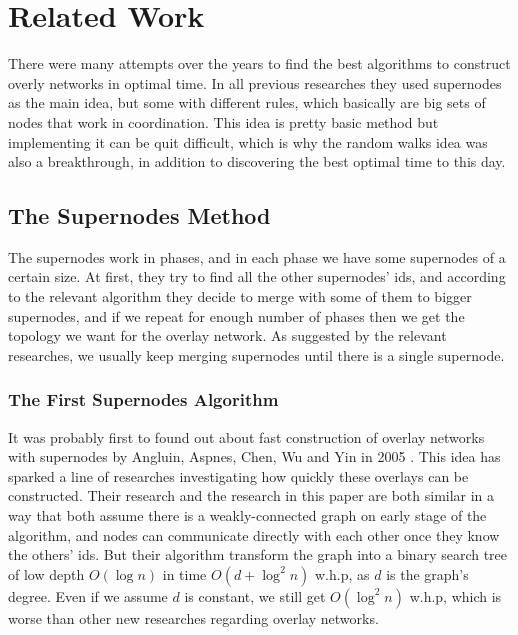 \documentclass[11pt]{article}
\begin{document}
\section{Related Work}
There were many attempts over the years to find the best algorithms to construct overly networks in optimal time. In all previous researches they used supernodes as the main idea, but some with different rules, which basically are big sets of nodes that work in coordination. This idea is pretty basic method but implementing it can be quit difficult, which is why the random walks idea was also a breakthrough, in addition to discovering the best optimal time to this day.

\subsection{The Supernodes Method}
The supernodes work in phases, and in each phase we have some supernodes of a certain size. At first, they try to find all the other supernodes' ids, and according to the relevant algorithm they decide to merge with some of them to bigger supernodes, and if we repeat for enough number of phases then we get the topology we want for the overlay network. As suggested by the relevant researches, we usually keep merging supernodes until there is a single supernode.

\subsubsection{The First Supernodes Algorithm}
It was probably first to found out about fast construction of overlay networks with supernodes by Angluin, Aspnes, Chen, Wu and Yin in 2005 \cite{ref2}. This  idea has sparked a line of researches investigating how quickly these overlays can be constructed. Their research and the research in this paper are both similar in a way that both assume there is a weakly-connected graph on early stage of the algorithm, and nodes can communicate directly with each other once they know the others' ids. But their algorithm transform the graph into a binary search tree of low depth $O(\log{n})$ in time $O(d+\log^2{n})$ w.h.p, as $d$ is the graph's degree. Even if we assume $d$ is constant, we still get $O(\log^2{n})$ w.h.p, which is worse than other new researches regarding overlay networks.
\end{document}
